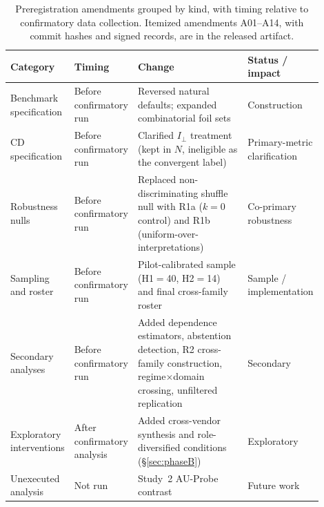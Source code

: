 \documentclass[acmsmall,screen,nonacm]{acmart}
\newcommand{\iperp}{\ensuremath{I_\perp}}
\begin{document}
\begin{table}[t]
\centering\small
\caption{Preregistration amendments grouped by kind, with timing relative to confirmatory data
collection. Itemized amendments A01--A14, with commit hashes and signed records, are in the
released artifact.}
\label{tab:deviations}
\begin{tabular}{@{}p{0.18\linewidth}p{0.17\linewidth}p{0.40\linewidth}p{0.15\linewidth}@{}}
\toprule
Category & Timing & Change & Status / impact \\
\midrule
Benchmark specification & Before confirmatory run & Reversed natural defaults; expanded
combinatorial foil sets & Construction \\
CD specification & Before confirmatory run & Clarified \iperp{} treatment (kept in $N$,
ineligible as the convergent label) & Primary-metric clarification \\
Robustness nulls & Before confirmatory run & Replaced non-discriminating shuffle null with R1a
($k{=}0$ control) and R1b (uniform-over-interpretations) & Co-primary robustness \\
Sampling and roster & Before confirmatory run & Pilot-calibrated sample (H1$=$40, H2$=$14) and
final cross-family roster & Sample / implementation \\
Secondary analyses & Before confirmatory run & Added dependence estimators, abstention
detection, R2 cross-family construction, regime$\times$domain crossing, unfiltered replication &
Secondary \\
Exploratory interventions & After confirmatory analysis & Added cross-vendor synthesis and
role-diversified conditions (\S\ref{sec:phaseB}) & Exploratory \\
Unexecuted analysis & Not run & Study~2 AU-Probe contrast & Future work \\
\bottomrule
\end{tabular}
\end{table}
\end{document}
